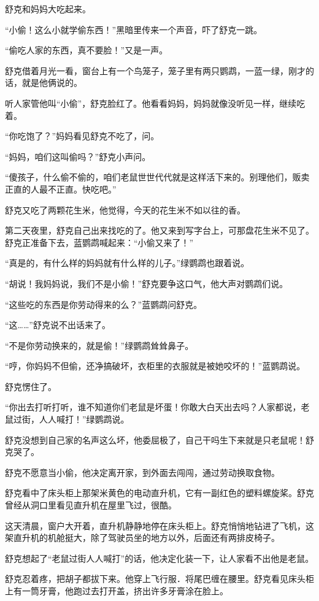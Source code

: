 \documentclass[a4paper,12pt,UTF8,twoside]{ctexbook}
\begin{document}
舒克和妈妈大吃起来。

“小偷！这么小就学偷东西！”黑暗里传来一个声音，吓了舒克一跳。

“偷吃人家的东西，真不要脸！”又是一声。

舒克借着月光一看，窗台上有一个鸟笼子，笼子里有两只鹦鹉，一蓝一绿，刚才的话，就是他俩说的。

听人家管他叫“小偷”，舒克脸红了。他看看妈妈，妈妈就像没听见一样，继续吃着。

“你吃饱了？”妈妈看见舒克不吃了，问。

“妈妈，咱们这叫偷吗？”舒克小声问。

“傻孩子，什么偷不偷的，咱们老鼠世世代代就是这样活下来的。别理他们，贩卖正直的人最不正直。快吃吧。”

舒克又吃了两颗花生米，他觉得，今天的花生米不如以往的香。

第二天夜里，舒克自己出来找吃的了。他又来到写字台上，可那盘花生米不见了。舒克正准备下去，蓝鹦鹉喊起来：“小偷又来了！”

“真是的，有什么样的妈妈就有什么样的儿子。”绿鹦鹉也跟着说。

“胡说！我妈妈说，我们不是小偷！”舒克要争这口气，他大声对鹦鹉们说。

“这些吃的东西是你劳动得来的么？”蓝鹦鹉问舒克。

“这……”舒克说不出话来了。

“不是你劳动换来的，就是偷！”绿鹦鹉耸耸鼻子。

“哼，你妈妈不但偷，还净搞破坏，衣柜里的衣服就是被她咬坏的！”蓝鹦鹉说。

舒克愣住了。

“你出去打听打听，谁不知道你们老鼠是坏蛋！你敢大白天出去吗？人家都说，老鼠过街，人人喊打！”绿鹦鹉说。

舒克没想到自己家的名声这么坏，他委屈极了，自己干吗生下来就是只老鼠呢！舒克哭了。

舒克不愿意当小偷，他决定离开家，到外面去闯闯，通过劳动换取食物。

舒克看中了床头柜上那架米黄色的电动直升机，它有一副红色的塑料螺旋桨。舒克曾经从洞口里看见直升机在屋里飞过，很酷。

这天清晨，窗户大开着，直升机静静地停在床头柜上。舒克悄悄地钻进了飞机，这架直升机的机舱挺大，除了驾驶员坐的地方以外，后面还有两排皮椅子。

舒克想起了“老鼠过街人人喊打”的话，他决定化装一下，让人家看不出他是老鼠。

舒克忍着疼，把胡子都拔下来。他穿上飞行服．将尾巴缠在腰里。舒克看见床头柜上有一筒牙膏，他跑过去打开盖，挤出许多牙膏涂在脸上。
\end{document}
